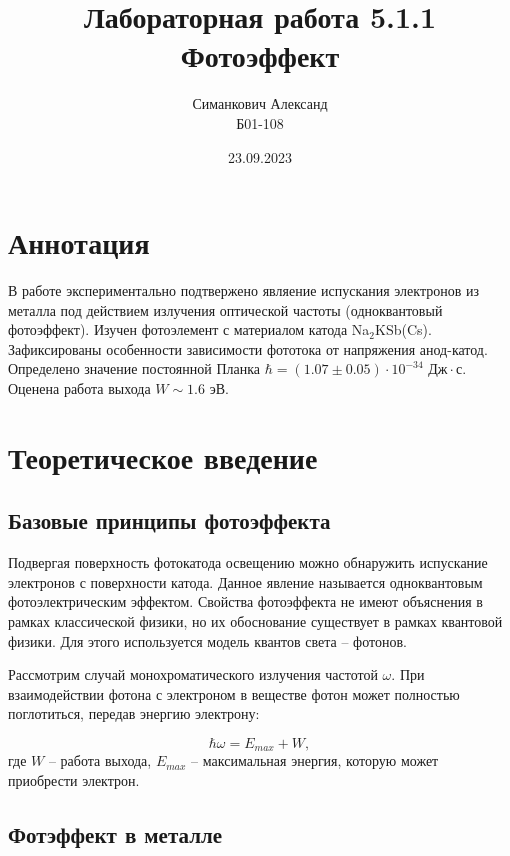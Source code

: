 \documentclass[12pt,a4paper]{article}
\title{Лабораторная работа 5.1.1 \\ Фотоэффект}
\author{Симанкович Александ\\ Б01-108}
\date{23.09.2023}
\begin{document}
	\maketitle
	
	\section*{Аннотация}
	
	В работе экспериментально подтвержено являение испускания электронов из металла под действием излучения оптической частоты (одноквантовый фотоэффект). Изучен фотоэлемент с материалом катода Na$_2$KSb(Cs). Зафиксированы особенности зависимости фототока от напряжения анод-катод. Определено значение постоянной Планка $\hbar = (1.07 \pm 0.05)\cdot 10^{-34} \text{ Дж}\cdot\text{с}$. Оценена работа выхода $W \sim 1.6 \text{ эВ}$.
	
	

	\section*{Теоретическое введение}
	
	\subsection*{Базовые принципы фотоэффекта}
	
	Подвергая поверхность фотокатода освещению можно обнаружить испускание электронов с поверхности катода. Данное явление называется одноквантовым фотоэлектрическим эффектом.
	Свойства фотоэффекта не имеют объяснения в рамках классической физики, но их обоснование существует в рамках квантовой физики. Для этого используется модель квантов света -- фотонов.
	
	Рассмотрим случай монохроматического излучения частотой $\omega$. При взаимодействии фотона с электроном в веществе фотон может полностью поглотиться, передав энергию электрону:
	
	\begin{equation}
		\hbar \omega = E_{max} + W,
		\label{eq:basic}
	\end{equation}
	где $W$ -- работа выхода, $E_{max}$ -- максимальная энергия, которую может приобрести электрон. 
	
	\subsection*{Фотэффект в металле}
\end{document}
